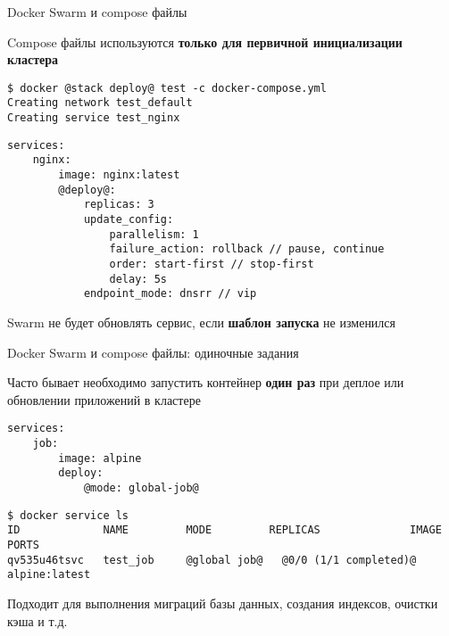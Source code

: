 \begin{frame}[fragile]{Docker Swarm и compose файлы}

Compose файлы используются \textbf{только для первичной инициализации кластера}

\begin{tcolorbox-code}
\begin{lstlisting}[style=base]
$ docker @stack deploy@ test -c docker-compose.yml
Creating network test_default
Creating service test_nginx

\end{lstlisting}
\end{tcolorbox-code}


\begin{tcolorbox-code}
\begin{lstlisting}[style=base]
services:
    nginx:
        image: nginx:latest
        @deploy@:
            replicas: 3
            update_config:
                parallelism: 1
                failure_action: rollback // pause, continue
                order: start-first // stop-first
                delay: 5s
            endpoint_mode: dnsrr // vip
\end{lstlisting}
\end{tcolorbox-code}

Swarm {\color{good} не будет обновлять сервис}, если \textbf{шаблон запуска} не изменился

\end{frame}

\begin{frame}[fragile]{Docker Swarm и compose файлы: одиночные задания}

Часто бывает необходимо запустить контейнер \textbf{один раз} при деплое или обновлении приложений в кластере


\begin{tcolorbox-code}
\begin{lstlisting}[style=base]
services:
    job:
        image: alpine
        deploy:
            @mode: global-job@
    \end{lstlisting}
\end{tcolorbox-code}

\begin{tcolorbox-code}
\begin{lstlisting}[style=base]
$ docker service ls
ID             NAME         MODE         REPLICAS              IMAGE           PORTS
qv535u46tsvc   test_job     @global job@   @0/0 (1/1 completed)@   alpine:latest   
\end{lstlisting}
\end{tcolorbox-code}

Подходит для выполнения миграций базы данных, создания индексов, очистки кэша и т.д.

\end{frame}

